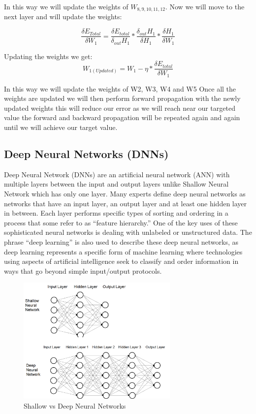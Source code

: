 In this way we will update the weights of $W_{8,9,10,11,12}$. Now we will move to the next layer and will update the weights:

\begin{equation}
\frac{\delta E_{Total}}{\delta W_{1}} = \frac{\delta E_{total}}{\delta_{out}H_{1}}*\frac{\delta_{out}H_{1}}{\delta H_{1}}*\frac{\delta H_{1}}{\delta W_{1}}    
\end{equation}

Updating the weights we get:
\begin{equation}
W_{1(Updated)} = W_{1}-\eta*\frac{\delta E_{total}}{\delta W_{1}}    
\end{equation}

In this way we will update the weights of W2, W3, W4 and W5 Once all the weights are updated we will then perform forward propagation with the newly updated weights this will reduce our error as we will reach near our targeted value the forward and backward propagation will be repeated again and again until we will achieve our target value.

\subsection{Deep Neural Networks (DNNs)}
Deep Neural Network (DNNs) are an artificial neural network (ANN) with multiple layers between the input and output layers unlike Shallow Neural Network which has only one layer. Many experts define deep neural networks as networks that have an input layer, an output layer and at least one hidden layer in between. Each layer performs specific types of sorting and ordering in a process that some refer to as “feature hierarchy.” One of the key uses of these sophisticated neural networks is dealing with unlabeled or unstructured data. The phrase “deep learning” is also used to describe these deep neural networks, as deep learning represents a specific form of machine learning where technologies using aspects of artificial intelligence seek to classify and order information in ways that go beyond simple input/output protocols.

\begin{figure}[h!]
    \centering
    \includegraphics[width=0.7\textwidth]{img/DNN.png}
    \caption{Shallow vs Deep Neural Networks}
    \label{fig:shallow-deep-NN}
\end{figure}


